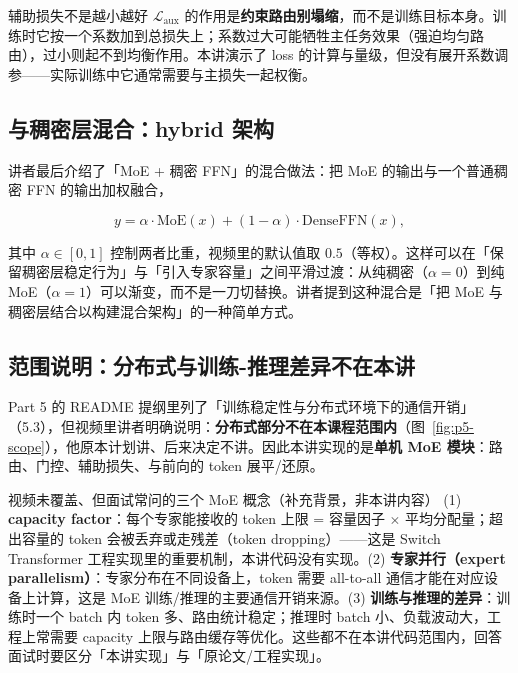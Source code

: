 \begin{warningbox}{辅助损失不是越小越好}
$\mathcal{L}_{\text{aux}}$ 的作用是\textbf{约束路由别塌缩}，而不是训练目标本身。训练时它按一个系数加到总损失上；系数过大可能牺牲主任务效果（强迫均匀路由），过小则起不到均衡作用。本讲演示了 loss 的计算与量级，但没有展开系数调参——实际训练中它通常需要与主损失一起权衡。
\end{warningbox}

\subsection{与稠密层混合：hybrid 架构}

讲者最后介绍了「MoE + 稠密 FFN」的混合做法：把 MoE 的输出与一个普通稠密 FFN 的输出加权融合，

$$
y = \alpha\cdot \mathrm{MoE}(x) + (1-\alpha)\cdot \mathrm{DenseFFN}(x),
$$

其中 $\alpha\in[0,1]$ 控制两者比重，视频里的默认值取 $0.5$（等权）。这样可以在「保留稠密层稳定行为」与「引入专家容量」之间平滑过渡：从纯稠密（$\alpha=0$）到纯 MoE（$\alpha=1$）可以渐变，而不是一刀切替换。讲者提到这种混合是「把 MoE 与稠密层结合以构建混合架构」的一种简单方式。

\subsection{范围说明：分布式与训练-推理差异不在本讲}

Part 5 的 README 提纲里列了「训练稳定性与分布式环境下的通信开销」（5.3），但视频里讲者明确说明：\textbf{分布式部分不在本课程范围内}（图~\ref{fig:p5-scope}），他原本计划讲、后来决定不讲。因此本讲实现的是\textbf{单机 MoE 模块}：路由、门控、辅助损失、与前向的 token 展平/还原。

\begin{knowledgebox}{视频未覆盖、但面试常问的三个 MoE 概念（补充背景，非本讲内容）}
(1) \textbf{capacity factor}：每个专家能接收的 token 上限 = 容量因子 $\times$ 平均分配量；超出容量的 token 会被丢弃或走残差（token dropping）——这是 Switch Transformer 工程实现里的重要机制，本讲代码没有实现。(2) \textbf{专家并行（expert parallelism）}：专家分布在不同设备上，token 需要 all-to-all 通信才能在对应设备上计算，这是 MoE 训练/推理的主要通信开销来源。(3) \textbf{训练与推理的差异}：训练时一个 batch 内 token 多、路由统计稳定；推理时 batch 小、负载波动大，工程上常需要 capacity 上限与路由缓存等优化。这些都不在本讲代码范围内，回答面试时要区分「本讲实现」与「原论文/工程实现」。
\end{knowledgebox}

